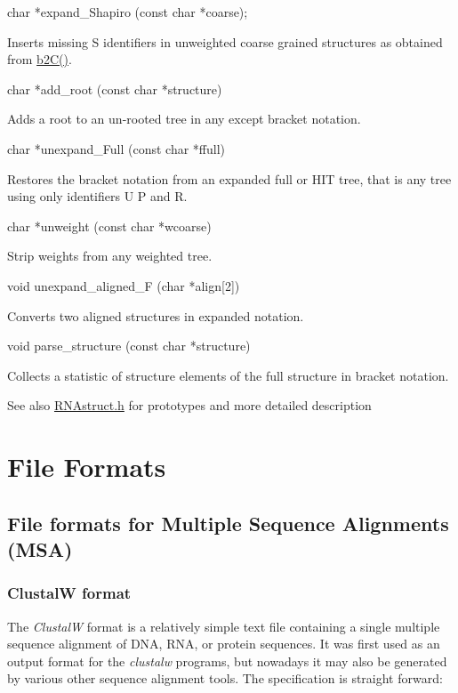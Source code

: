 \begin{DoxyVerb}char  *expand_Shapiro (const char *coarse);
\end{DoxyVerb}
 Inserts missing \textquotesingle{}S\textquotesingle{} identifiers in unweighted coarse grained structures as obtained from \hyperlink{group__struct__utils__deprecated_ga9c80d92391f2833549a8b6dac92233f0}{b2\+C()}.

\begin{DoxyVerb}char *add_root (const char *structure)
\end{DoxyVerb}
 Adds a root to an un-\/rooted tree in any except bracket notation.

\begin{DoxyVerb}char  *unexpand_Full (const char *ffull)
\end{DoxyVerb}
 Restores the bracket notation from an expanded full or H\+IT tree, that is any tree using only identifiers \textquotesingle{}U\textquotesingle{} \textquotesingle{}P\textquotesingle{} and \textquotesingle{}R\textquotesingle{}.

\begin{DoxyVerb}char  *unweight (const char *wcoarse)
\end{DoxyVerb}
 Strip weights from any weighted tree.

\begin{DoxyVerb}void   unexpand_aligned_F (char *align[2])
\end{DoxyVerb}
 Converts two aligned structures in expanded notation.

\begin{DoxyVerb}void   parse_structure (const char *structure)
\end{DoxyVerb}
 Collects a statistic of structure elements of the full structure in bracket notation.

\begin{DoxySeeAlso}{See also}
\hyperlink{RNAstruct_8h}{R\+N\+Astruct.\+h} for prototypes and more detailed description 
\end{DoxySeeAlso}
\hypertarget{file_formats}{}\section{File Formats}\label{file_formats}
\hypertarget{file_formats_msa-formats}{}\subsection{File formats for Multiple Sequence Alignments (\+M\+S\+A)}\label{file_formats_msa-formats}
\hypertarget{file_formats_msa-formats-clustal}{}\subsubsection{Clustal\+W format}\label{file_formats_msa-formats-clustal}
The {\itshape ClustalW} format is a relatively simple text file containing a single multiple sequence alignment of D\+NA, R\+NA, or protein sequences. It was first used as an output format for the {\itshape clustalw} programs, but nowadays it may also be generated by various other sequence alignment tools. The specification is straight forward\+:


